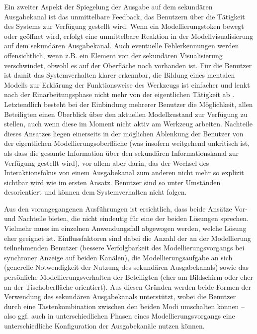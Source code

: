 Ein zweiter Aspekt der Spiegelung der Ausgabe auf dem sekundären Ausgabekanal ist das unmittelbare Feedback, das Benutzern über die Tätigkeit des Systems zur Verfügung gestellt wird. Wenn ein Modellierungstoken bewegt oder geöffnet wird, erfolgt eine unmittelbare Reaktion in der Modellvisualisierung auf dem sekundären Ausgabekanal. Auch eventuelle Fehlerkennungen werden offensichtlich, wenn z.B. ein Element von der sekundären Visualisierung verschwindet, obwohl es auf der Oberfläche noch vorhanden ist. Für die Benutzer ist damit das Systemverhalten klarer erkennbar, die Bildung eines mentalen Modells zur Erklärung der Funktionsweise des Werkzeugs ist einfacher und lenkt nach der Einarbeitungsphase nicht mehr von der eigentlichen Tätigkeit ab \citep{Norman83a}. Letztendlich besteht bei der Einbindung mehrerer Benutzer die Möglichkeit, allen Beteiligten einen Überblick über den aktuellen Modellzustand zur Verfügung zu stellen, auch wenn diese im Moment nicht aktiv am Werkzeug arbeiten. Nachteile dieses Ansatzes liegen einerseits in der möglichen Ablenkung der Benutzer von der eigentlichen Modellierungsoberfläche (was insofern weitgehend unkritisch ist, als dass die gesamte Information über den sekundären Informationskanal zur Verfügung gestellt wird), vor allem aber darin, das der Wechsel des Interaktionsfokus von einem Ausgabekanal zum anderen nicht mehr so explizit sichtbar wird wie im ersten Ansatz. Benutzer sind so unter Umständen desorientiert und können dem Systemverhalten nicht folgen.

Aus den vorangegangenen Ausführungen ist ersichtlich, dass beide Ansätze Vor- und Nachteile bieten, die nicht eindeutig für eine der beiden Lösungen sprechen. Vielmehr muss im einzelnen Anwendungsfall abgewogen werden, welche Lösung eher geeignet ist. Einflussfaktoren sind dabei die Anzahl der an der Modellierung teilnehmenden Benutzer (bessere Verfolgbarkeit des Modellierungsvorgangs bei synchroner Anzeige auf beiden Kanälen), die Modellierungsaufgabe an sich (generelle Notwendigkeit der Nutzung des sekundären Ausgabekanals) sowie das persönliche Modellierungsverhalten der Beteiligten (eher am Bildschirm oder eher an der Tischoberfläche orientiert). Aus diesen Gründen werden beide Formen der Verwendung des sekundären Ausgabekanals unterstützt, wobei die Benutzer durch eine Tastenkombination zwischen den beiden Modi umschalten können -- also ggf. auch in unterschiedlichen Phasen eines Modellierungsvorgangs eine unterschiedliche Konfiguration der Ausgabekanäle nutzen können.


